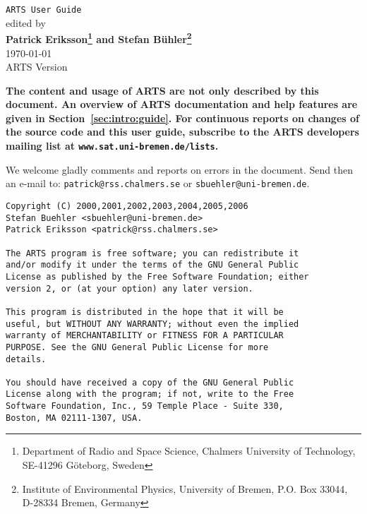 





%
\renewcommand{\thepage}{title \arabic{page}} 

\thispagestyle{plain}
\begin{center}
  \vspace*{2cm}
  {\Huge \verb|ARTS User Guide|\\}
  \vspace*{1cm}
  {\large edited by \\}
  \vspace*{1cm}
  {\Large \bf Patrick Eriksson\footnote{
      Department of Radio and Space Science, 
      Chalmers University of Technology, SE-41296 G\"oteborg, Sweden} 
      and
    Stefan B\"uhler\footnote{
      Institute of Environmental Physics, University of Bremen, 
      P.O. Box 33044, D-28334 Bremen, Germany}  
    }\\
   \vspace*{2cm}
   {\large \today\\
    ARTS Version 
   }
\end{center}
\vspace*{4cm}
{\normalsize \bf
  \noindent
  The content and usage of ARTS are not only described by this
  document. An overview of ARTS documentation and help features are
  given in Section~\ref{sec:intro:guide}. For continuous reports on
  changes of the source code and this user guide, subscribe to the
  ARTS developers mailing list at \verb|www.sat.uni-bremen.de/lists|.

  We welcome gladly comments and reports on errors in the document.
  Send then an e-mail to: \verb|patrick@rss.chalmers.se| or 
  \verb|sbuehler@uni-bremen.de|.
}

\newpage                          
\thispagestyle{empty}
\vspace*{\fill}
\noindent
\begin{verbatim}
Copyright (C) 2000,2001,2002,2003,2004,2005,2006
Stefan Buehler <sbuehler@uni-bremen.de>
Patrick Eriksson <patrick@rss.chalmers.se>

The ARTS program is free software; you can redistribute it
and/or modify it under the terms of the GNU General Public
License as published by the Free Software Foundation; either
version 2, or (at your option) any later version.

This program is distributed in the hope that it will be
useful, but WITHOUT ANY WARRANTY; without even the implied
warranty of MERCHANTABILITY or FITNESS FOR A PARTICULAR
PURPOSE. See the GNU General Public License for more
details. 

You should have received a copy of the GNU General Public
License along with the program; if not, write to the Free
Software Foundation, Inc., 59 Temple Place - Suite 330,
Boston, MA 02111-1307, USA. 
\end{verbatim}




